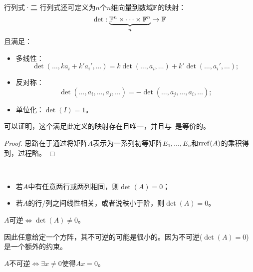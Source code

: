 \begin{definition}
	{行列式·二}{}
	行列式还可定义为$n$个$n$维向量到数域$\mathbb F$的映射：
	\[
		\det:\underbrace{\mathbb F^n\times\cdots\times\mathbb F^n}_n\to\mathbb F
	\]
	且满足：
	\begin{itemize}
		\item 多线性：
		\begin{equation}
			\det(\ldots,ka_i+k'a_i',\ldots)=k\det(\ldots,a_i,\ldots)+k'\det(\ldots,a_i',\ldots);
		\end{equation}
		\item 反对称：
		\begin{equation}
			\det(\ldots,a_i,\ldots,a_j,\ldots)=-\det(\ldots,a_j,\ldots,a_i,\ldots);
		\end{equation}
		\item 单位化：$\det(I)=1$。
	\end{itemize}
	可以证明，这个满足此定义的映射存在且唯一，并且与~是等价的。
\end{definition}
\begin{lemma}
	
\end{lemma}
\begin{proof}
	思路在于通过将矩阵$A$表示为一系列初等矩阵$E_1,\ldots,E_n$和$\operatorname{rref}(A)$的乘积得到，过程略。
\end{proof}
\begin{corollary}
	~%
	\begin{itemize}
		\item 若$A$中有任意两行或两列相同，则$\det(A)=0$；
		\item 若$A$的行/列之间线性相关，或者说秩小于阶，则$\det(A)=0$。
	\end{itemize}
\end{corollary}

\begin{theorem}
	{}{}
	$A$可逆$\iff\det(A)\neq 0$。
\end{theorem}

\begin{remark}
	因此任意给定一个方阵，其不可逆的可能是很小的。因为不可逆($\det(A)=0$)是一个额外的约束。
\end{remark}

\begin{corollary}
	$A$不可逆$\iff\exists x\neq 0$使得$Ax=0$。
\end{corollary}

